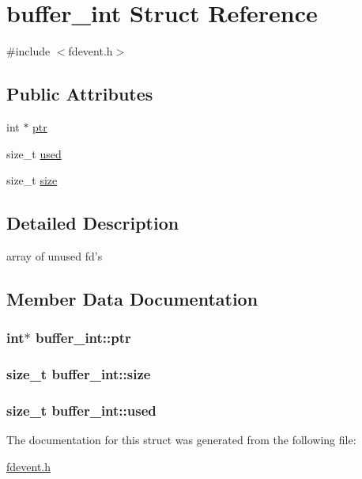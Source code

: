 \hypertarget{structbuffer__int}{\section{buffer\-\_\-int Struct Reference}
\label{structbuffer__int}
}


{\ttfamily \#include $<$fdevent.\-h$>$}

\subsection*{Public Attributes}
\begin{DoxyCompactItemize}
\item 
int $\ast$ \hyperlink{structbuffer__int_ab92f22d7b59a07218f31c9460cbc0161}{ptr}
\item 
size\-\_\-t \hyperlink{structbuffer__int_ae95c0d96fbb697b7f88bac0e70e11b82}{used}
\item 
size\-\_\-t \hyperlink{structbuffer__int_aa12e0b4da6b919f5970513071e03d592}{size}
\end{DoxyCompactItemize}


\subsection{Detailed Description}
array of unused fd's 

\subsection{Member Data Documentation}
\hypertarget{structbuffer__int_ab92f22d7b59a07218f31c9460cbc0161}{
\subsubsection[{ptr}]{\setlength{\rightskip}{0pt plus 5cm}int$\ast$ buffer\-\_\-int\-::ptr}}\label{structbuffer__int_ab92f22d7b59a07218f31c9460cbc0161}
\hypertarget{structbuffer__int_aa12e0b4da6b919f5970513071e03d592}{
\subsubsection[{size}]{\setlength{\rightskip}{0pt plus 5cm}size\-\_\-t buffer\-\_\-int\-::size}}\label{structbuffer__int_aa12e0b4da6b919f5970513071e03d592}
\hypertarget{structbuffer__int_ae95c0d96fbb697b7f88bac0e70e11b82}{
\subsubsection[{used}]{\setlength{\rightskip}{0pt plus 5cm}size\-\_\-t buffer\-\_\-int\-::used}}\label{structbuffer__int_ae95c0d96fbb697b7f88bac0e70e11b82}


The documentation for this struct was generated from the following file\-:\begin{DoxyCompactItemize}
\item 
\hyperlink{fdevent_8h}{fdevent.\-h}\end{DoxyCompactItemize}
